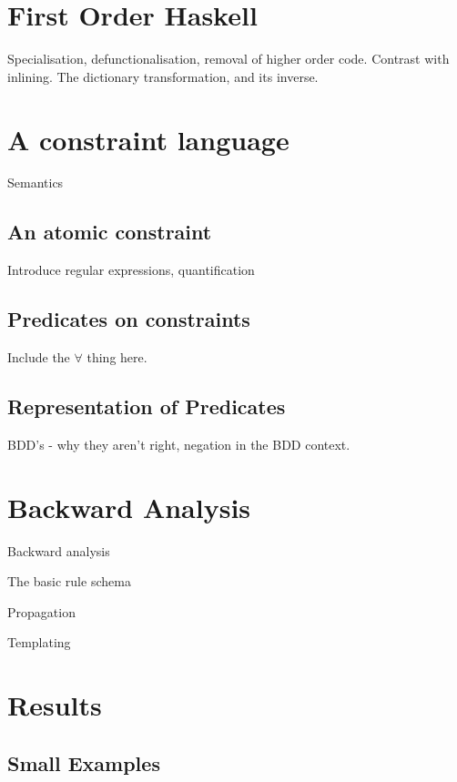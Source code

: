 \documentclass[preprint]{sigplanconf}
\begin{document}
\section{First Order Haskell}
\label{chap:defunc}

Specialisation, defunctionalisation, removal of higher order code. Contrast
with inlining. The dictionary transformation, and its inverse.

\section{A constraint language}
\label{chap:constraints}

Semantics

\subsection{An atomic constraint}

Introduce regular expressions, quantification


\subsection{Predicates on constraints}

Include the $\forall$ thing here.

\subsection{Representation of Predicates}

BDD's - why they aren't right, negation in the BDD context.

\section{Backward Analysis}
\label{chap:backward}

Backward analysis

The basic rule schema

Propagation

Templating

\section{Results}
\label{chap:results}

\subsection{Small Examples}
\end{document}
